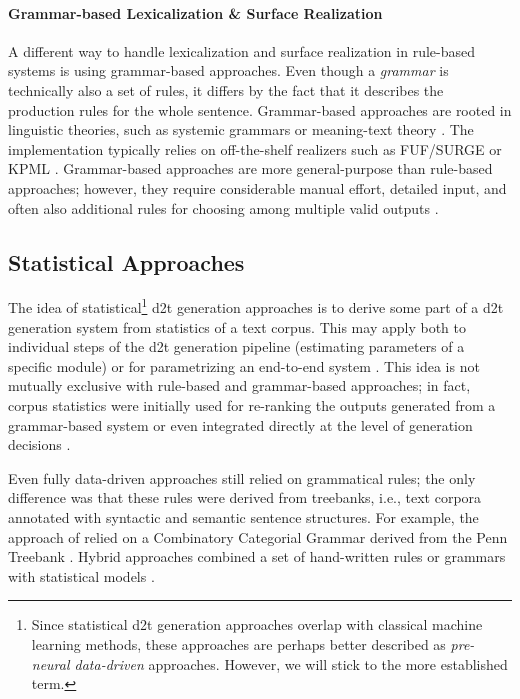 {\paragraph{Grammar-based Lexicalization \& Surface Realization}
A different way to handle lexicalization and surface realization in rule-based systems is using grammar-based approaches. Even though a \emph{grammar} is technically also a set of rules, it differs by the fact that it describes the production rules for the whole sentence.
Grammar-based approaches are rooted in linguistic theories, such as systemic grammars \cite{halliday1985systemic,matthiessen1991lexico} or meaning-text theory \cite{mel1988dependency,goldberg1994using}. The implementation typically relies on off-the-shelf realizers such as FUF/SURGE \cite{elhadad1997surge} or KPML \cite{bateman1997enabling}. Grammar-based approaches are more general-purpose than rule-based approaches; however, they require considerable manual effort, detailed input, and often also additional rules for choosing among multiple valid outputs \cite{gattSurveyStateArt2018}.


\subsection{Statistical Approaches}
\label{sec:stat-d2t}
The idea of statistical\footnote{Since statistical \ac{d2t} generation approaches overlap with classical machine learning methods, these approaches are perhaps better described as \emph{pre-neural data-driven} approaches. However, we will stick to the more established term.} \ac{d2t} generation approaches is to derive some part of a \ac{d2t} generation system from statistics of a text corpus. This may apply both to individual steps of the \ac{d2t} generation pipeline (estimating parameters of a specific module) or for parametrizing an end-to-end system \cite{liang2009learning,dusekTrainingNaturalLanguage2015}. This idea is not mutually exclusive with rule-based and grammar-based approaches; in fact, corpus statistics were initially used for re-ranking the outputs generated from a grammar-based system \cite{bangalore2000corpus,langkilde2000forest,ratnaparkhi2000trainable} or even integrated directly at the level of generation decisions \cite{belz2008automatic}.

Even fully data-driven approaches still relied on grammatical rules; the only difference was that these rules were derived from treebanks, i.e., text corpora annotated with syntactic and semantic sentence structures. For example, the approach of \citet{white2007towards} relied on a Combinatory Categorial Grammar \cite{steedman2001syntactic} derived from the Penn Treebank \cite{hockenmaier2007ccgbank}. Hybrid approaches combined a set of hand-written rules or grammars with statistical models \cite{konstas2012concept,gardent2017statistical}.

}
